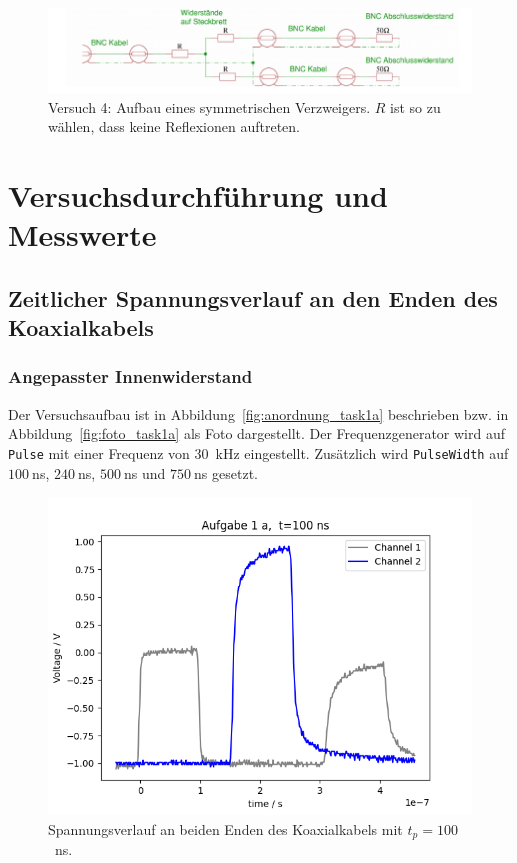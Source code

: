 \documentclass{article}
\begin{document}
\begin{figure}[H]
\centering
\caption{Versuch 4: Aufbau eines symmetrischen Verzweigers. $R$ ist so zu wählen, dass keine Reflexionen auftreten.}
\label{fig:anordnung_task4}
\includegraphics[scale=2]{task4.png}
\end{figure}


\section{Versuchsdurchführung und Messwerte}

\subsection{Zeitlicher Spannungsverlauf an den Enden des Koaxialkabels}

\subsubsection{Angepasster Innenwiderstand}

Der Versuchsaufbau ist in Abbildung~\ref{fig:anordnung_task1a} beschrieben bzw. in Abbildung~\ref{fig:foto_task1a} als Foto dargestellt. Der Frequenzgenerator wird auf \texttt{Pulse} mit einer Frequenz von 30~kHz eingestellt. Zusätzlich wird \texttt{PulseWidth} auf $100~$ns, $240~$ns, $500~$ns und $750~$ns gesetzt.



\begin{figure}[H]
\centering
\caption{Spannungsverlauf an beiden Enden des Koaxialkabels mit $t_p=100$~ns.}
\label{fig:task1a_100ns}
\includegraphics[scale=0.6]{bilder/task1a/task1a_100ns.png}
\end{figure}
\end{document}
